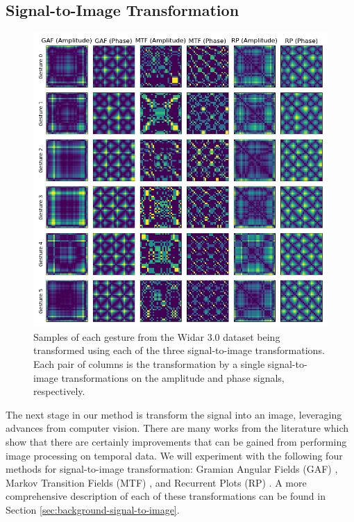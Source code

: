 \subsection{Signal-to-Image Transformation}\label{sec:methodology-signal-to-image}
\begin{figure}
	\centering
	\includegraphics[width=\textwidth]{figures/transforms}
	\caption{Samples of each gesture from the Widar 3.0 dataset being transformed using each of the three signal-to-image transformations. Each pair of columns is the transformation by a single signal-to-image transformations on the amplitude and phase signals, respectively.}
	\label{fig:transform-samples}
\end{figure}


The next stage in our method is transform the signal into an image, leveraging advances from computer vision.
There are many works from the literature which show that there are certainly improvements that can be gained from performing image processing on temporal data.
We will experiment with the following four methods for signal-to-image transformation: Gramian Angular Fields (GAF) \cite{wang2015imaging}, Markov Transition Fields (MTF) \cite{wang2015imaging}, and Recurrent Plots (RP) \cite{eckmann1995recurrence}.
A more comprehensive description of each of these transformations can be found in Section \ref{sec:background-signal-to-image}.

